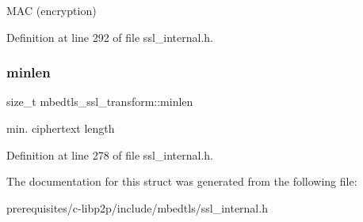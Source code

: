 M\+AC (encryption) 

Definition at line 292 of file ssl\+\_\+internal.\+h.

\mbox{\label{structmbedtls__ssl__transform_aaa43c099c7bc4f20f283362fd2feb619}} 
\subsubsection{\texorpdfstring{minlen}{minlen}}
{\footnotesize\ttfamily size\+\_\+t mbedtls\+\_\+ssl\+\_\+transform\+::minlen}

min. ciphertext length 

Definition at line 278 of file ssl\+\_\+internal.\+h.



The documentation for this struct was generated from the following file\+:\begin{DoxyCompactItemize}
\item 
prerequisites/c-\/libp2p/include/mbedtls/ssl\+\_\+internal.\+h\end{DoxyCompactItemize}
